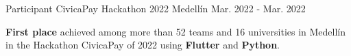 
\begin{cventries}
  \cventry
  {Participant} %
  {CivicaPay Hackathon 2022} %
  {Medellín} %
  {Mar. 2022 - Mar. 2022} %
  {
    \begin{cvitems} %
      \item {\textbf{First place} achieved among more than 52 teams and 16 universities in
                  Medellín in the Hackathon CivicaPay of 2022 using \textbf{Flutter} and \textbf{Python}.}
    \end{cvitems}
  }

\end{cventries}
